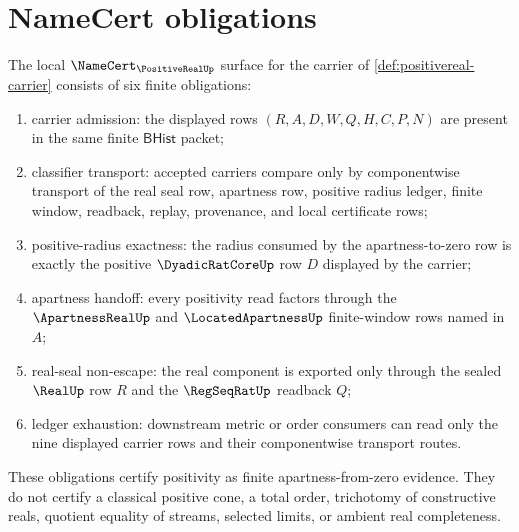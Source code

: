 \section{NameCert obligations}
\label{sec:positivereal-namecert-obligations}

\begin{theorem}
\label{thm:positivereal-namecert-obligations}
The local $\NameCert_{\PositiveRealUp}$ surface for the carrier of
\autoref{def:positivereal-carrier} consists of six finite obligations:
\begin{enumerate}
\item carrier admission: the displayed rows $(R,A,D,W,Q,H,C,P,N)$ are present
in the same finite $\mathsf{BHist}$ packet;
\item classifier transport: accepted carriers compare only by componentwise
transport of the real seal row, apartness row, positive radius ledger, finite
window, readback, replay, provenance, and local certificate rows;
\item positive-radius exactness: the radius consumed by the apartness-to-zero
row is exactly the positive $\DyadicRatCoreUp$ row $D$ displayed by the
carrier;
\item apartness handoff: every positivity read factors through the
$\ApartnessRealUp$ and $\LocatedApartnessUp$ finite-window rows named in $A$;
\item real-seal non-escape: the real component is exported only through the
sealed $\RealUp$ row $R$ and the $\RegSeqRatUp$ readback $Q$;
\item ledger exhaustion: downstream metric or order consumers can read only
the nine displayed carrier rows and their componentwise transport routes.
\end{enumerate}
These obligations certify positivity as finite apartness-from-zero evidence.
They do not certify a classical positive cone, a total order, trichotomy of
constructive reals, quotient equality of streams, selected limits, or ambient
real completeness.
\end{theorem}
